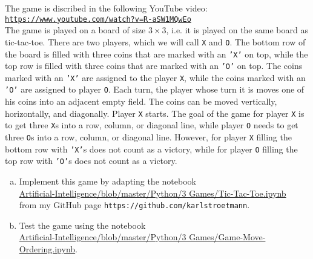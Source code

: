 \exercise
The game  is discribed in the following YouTube video:
\\[0.2cm]
\hspace*{1.3cm}
\href{https://www.youtube.com/watch?v=R-aSW1MQwEo}{\texttt{https://www.youtube.com/watch?v=R-aSW1MQwEo}}
\\[0.2cm]
The game is played on a board of size $3 \times 3$, i.e. it is played on the same board as tic-tac-toe.
There are two players, which we will call \texttt{X} and \texttt{O}.  The bottom row of the board is filled
with three coins that are marked with an \texttt{'X'} on top, while the top row is filled with three coins that
are marked with an \texttt{'O'} on top.  The coins marked with an \texttt{'X'} are assigned to the player \texttt{X},
while the coins marked with an \texttt{'O'} are assigned to player \texttt{O}.
Each turn, the player whose turn it is moves one of his coins into an adjacent empty field.  The coins can be
moved vertically, horizontally, and diagonally. 
Player \texttt{X} starts.  The goal of the game for player \texttt{X} is to get three \texttt{X}s into a row, column, or
diagonal line, while player \texttt{O} needs to get three \texttt{O}s into a row, column, or diagonal line.  However, for
player \texttt{X} filling the bottom row with \texttt{'X'}s does not count as a victory, while for player
\texttt{O}  filling the top row with \texttt{'O'}s does not count as a victory.
\begin{enumerate}[(a)]
\item Implement this game by adapting the notebook
      \\[0.2cm]
      \hspace*{1.3cm}
      \href{https://github.com/karlstroetmann/Artificial-Intelligence/blob/master/Python/3 Games/Tic-Tac-Toe.ipynb}{
            Artificial-Intelligence/blob/master/Python/3 Games/Tic-Tac-Toe.ipynb}
      \\[0.2cm]
      from my GitHub page \texttt{https://github.com/karlstroetmann}.
\item Test the game using the notebook
      \\[0.2cm]
      \hspace*{1.3cm}
      \href{https://github.com/karlstroetmann/Artificial-Intelligence/blob/master/Python/3 Games/Game-Move-Ordering.ipynb}{
           Artificial-Intelligence/blob/master/Python/3 Games/Game-Move-Ordering.ipynb}.
      \eox
\end{enumerate}

